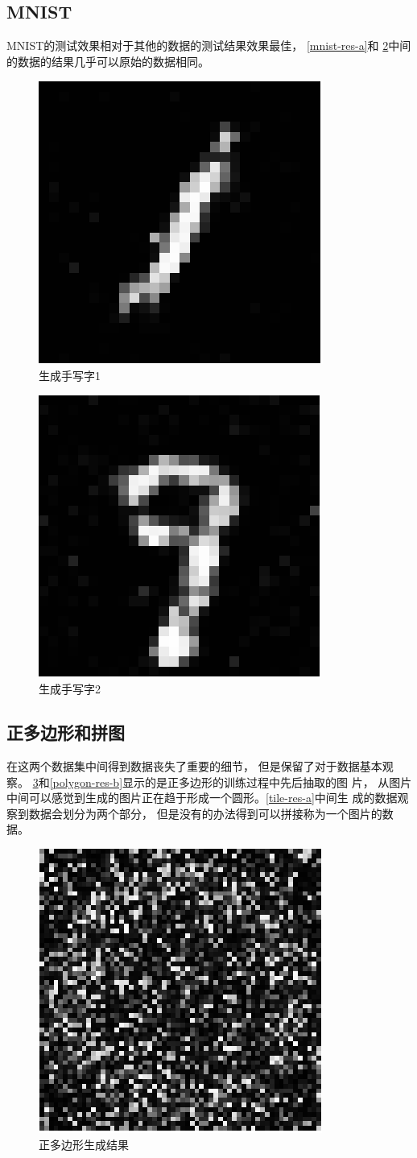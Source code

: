 \subsection{MNIST}
MNIST的测试效果相对于其他的数据的测试结果效果最佳， \ref{mnist-res-a}和
\ref{mnist-res-b}中间的数据的结果几乎可以原始的数据相同。
\begin{figure}[!hbt]
    \centering
    \includegraphics[width=0.3\linewidth]{pic/mnist-res-a.png}
    \caption{生成手写字1}
    \label{minist-res-a}
\end{figure}

\begin{figure}[!hbt]
    \centering
    \includegraphics[width=0.3\linewidth]{pic/mnist-res-b.png}
    \caption{生成手写字2}
    \label{mnist-res-b}
\end{figure}

\subsection{正多边形和拼图}
在这两个数据集中间得到数据丧失了重要的细节， 但是保留了对于数据基本观察。
\ref{polygon-res-a}和\ref{polygon-res-b}显示的是正多边形的训练过程中先后抽取的图
片， 从图片中间可以感觉到生成的图片正在趋于形成一个圆形。\ref{tile-res-a}中间生
成的数据观察到数据会划分为两个部分， 但是没有的办法得到可以拼接称为一个图片的数
据。
\begin{figure}[!hbt]
    \centering
    \includegraphics[width=0.3\linewidth]{pic/polygon-res-a.png}
    \caption{正多边形生成结果}
    \label{polygon-res-a}
\end{figure}

